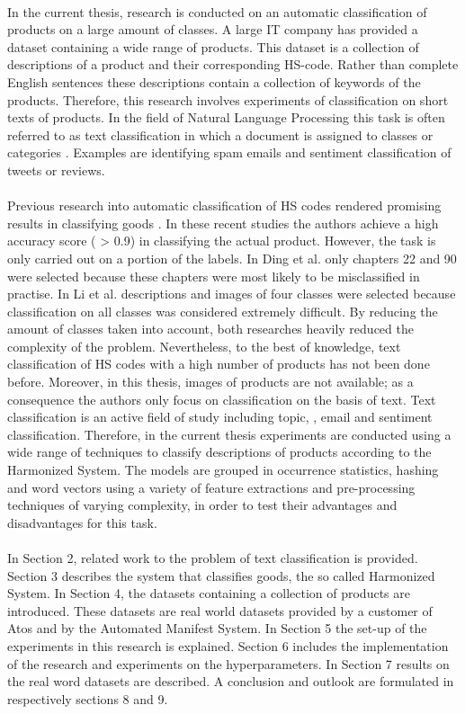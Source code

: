 \\
In the current thesis, research is conducted on an automatic classification of products on a large amount of classes. A large IT company has provided a dataset containing a wide range of products. This dataset is a collection of descriptions of a product and their corresponding HS-code. Rather than complete English sentences these descriptions contain a collection of keywords of the products. Therefore, this research involves experiments of classification on short texts of products. In the field of Natural Language Processing this task is often referred to as text classification in which a document is assigned to classes or categories \cite{Manning2008}. Examples are identifying spam emails and sentiment classification of tweets or reviews.\\
\\
Previous research into automatic classification of HS codes rendered promising results in classifying goods \cite{Ding2015} \cite{Li2019}. In these recent studies the authors achieve a high accuracy score ( > 0.9) in classifying the actual product. However, the task is only carried out on a portion of the labels. In Ding et al. \cite{Ding2015} only chapters 22 and 90 were selected because these chapters were most likely to be misclassified in practise. In Li et al. \cite{Li2019} descriptions and images of four classes were selected because classification on all classes was considered extremely difficult. By reducing the amount of classes taken into account, both researches heavily reduced the complexity of the problem. Nevertheless, to the best of knowledge, text classification of HS codes with a high number of products has not been done before. Moreover, in this thesis, images of products are not available; as a consequence the authors only focus on classification on the basis of text. Text classification is an active field of study including topic, \cite{Liu2016}, email \cite{7921698} and sentiment \cite{doi:10.1146/annurev-linguistics-011415-040518} classification. Therefore, in the current thesis experiments are conducted using a wide range of techniques to classify descriptions of products according to the Harmonized System. The models are grouped in occurrence statistics, hashing and word vectors using a variety of feature extractions and pre-processing techniques of varying complexity, in order to test their advantages and disadvantages for this task.
\\
\\
In Section 2, related work to the problem of text classification is provided. Section 3 describes the system that classifies goods, the so called Harmonized System. In Section 4, the datasets containing a collection of products are introduced. These datasets are real world datasets provided by a customer of Atos and by the Automated Manifest System. In Section 5 the set-up of the experiments in this research is explained. Section 6 includes the implementation of the research and experiments on the hyperparameters. In Section 7 results on the real word datasets are described. A conclusion and outlook are formulated in respectively sections 8 and 9.

